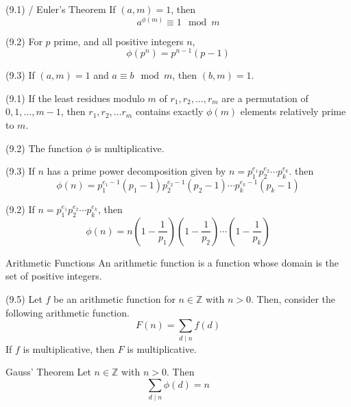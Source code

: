 \documentclass[12pt]{article}
\begin{document}
\begin{theorem}{(9.1) / Euler's Theorem}{}
    If $ \left( a, m \right) = 1 $, then
    \[ a^{\phi \left( m \right)} \equiv 1 \mod m \]
\end{theorem}
\begin{lemma}{(9.2)}{}
    For $ p $ prime, and all positive integers $ n $,
    \[ \phi \left( p^n \right) = p^{n-1} \left( p - 1 \right) \]
\end{lemma}
\begin{lemma}{(9.3)}{}
    If $ \left( a, m \right) = 1 $ and $ a \equiv b \mod m $, then $ \left( b, m \right) = 1 $.
\end{lemma}
\begin{corollary}{(9.1)}{}
    If the least residues modulo $ m $ of $ r_1, r_2, \dots, r_m $ are a permutation of $ 0, 1, \dots, m - 1 $, then $ r_1, r_2, \dots r_m $ contains exactly $ \phi \left( m \right) $ elements relatively prime to $ m $.
\end{corollary}
\begin{theorem}{(9.2)}{}
    The function $ \phi $ is multiplicative.
\end{theorem}
\begin{theorem}{(9.3)}{}
    If $ n $ has a prime power decomposition given by $ n = p_1^{e_1} p_2^{e_2} \cdots p_k^{e_k} $. then
    \[ \phi \left( n \right) = p_1^{e_1-1} \left( p_1 - 1 \right) p_2^{e_2-1} \left( p_2 - 1 \right) \cdots p_k^{e_k-1} \left( p_k - 1 \right) \]
\end{theorem}
\begin{corollary}{(9.2)}{}
    If $ n = p_1^{e_1} p_2^{e_2} \cdots p_k^{e_k} $, then
    \[ \phi \left( n \right) = n \left( 1 - \frac{1}{p_1} \right) \left( 1 - \frac{1}{p_2} \right) \cdots \left( 1 - \frac{1}{p_k} \right) \]
\end{corollary}
\begin{definition}{Arithmetic Functions}{}
    An arithmetic function is a function whose domain is the set of positive integers.    
\end{definition}
\begin{theorem}{(9.5)}{}
    Let $ f $ be an arithmetic function for $ n \in \mathbb{Z} $ with $ n > 0 $. Then, consider the following arithmetic function.
    \[ F \left( n \right) = \sum_{d \mid n} f \left( d \right) \]
    If $ f $ is multiplicative, then $ F $ is multiplicative.
\end{theorem}
\begin{theorem}{Gauss' Theorem}{}
    Let $ n \in \mathbb{Z} $ with $ n > 0 $. Then
    \[ \sum_{d \mid n} \phi \left( d \right) = n \]
\end{theorem}
\end{document}

